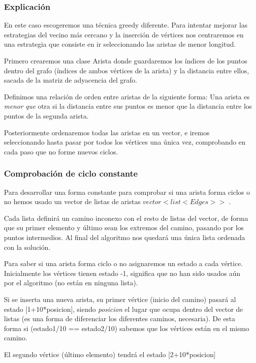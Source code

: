 
\subsubsection{Explicación}
En este caso escogeremos una técnica greedy diferente.
Para intentar mejorar las estrategias del vecino más cercano y la inserción de vértices nos centraremos en una estrategia que consiste en ir seleccionando las aristas de menor longitud.

Primero crearemos una clase Arista donde guardaremos los índices de los puntos dentro del grafo (índices de ambos vértices de la arista) y la distancia entre ellos, sacada de la matriz de adyacencia del grafo.

Definimos una relación de orden entre aristas de la siguiente forma:
Una arista es \textit{menor que} otra si la distancia entre sus puntos es menor que la distancia entre los puntos de la segunda arista.

Posteriormente ordenaremos todas las aristas en un vector, e iremos seleccionando hasta 
pasar por todos los vértices una única vez, comprobando en cada paso que no forme nuevos ciclos.

\subsubsection{Comprobación de ciclo constante}

Para desarrollar una forma constante para comprobar si una arista forma ciclos o no hemos usado un vector de listas de aristas $vector < list <Edges> >$ .

Cada lista definirá un camino inconexo con el resto de listas del vector, de forma que su primer elemento y último sean los extremos del camino, pasando por los puntos intermedios.
Al final del algoritmo nos quedará una única lista ordenada con la solución.

Para saber si una arista forma ciclo o no asignaremos un estado a cada vértice.
Inicialmente los vértices tienen estado -1, significa que no han sido usados aún por el algoritmo (no están en ninguna lista).

Si se inserta una nueva arista, su primer vértice (inicio del camino) pasará al estado
[1+10*posicion], siendo \textit{posicion} el lugar que ocupa dentro del vector de listas (es una forma de diferenciar los diferentes caminos, necesaria).
De esta forma si (estado1/10 == estado2/10) sabemos que los vértices están en el mismo camino.

El segundo vértice (último elemento) tendrá el estado [2+10*posicion]
            
